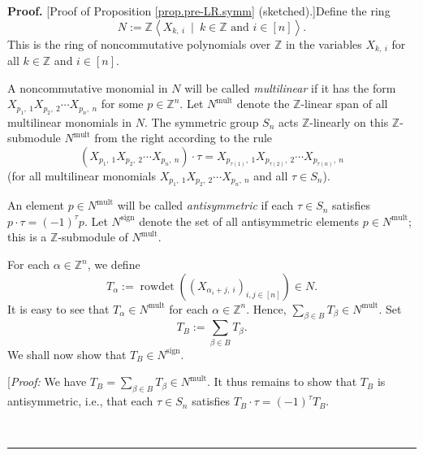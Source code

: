 \documentclass[numbers=enddot,12pt,final,onecolumn,notitlepage,english]{scrartcl}%
\theoremstyle{definition}
\newenvironment{proof}[1][Proof]{\noindent\textbf{#1.} }{\ \rule{0.5em}{0.5em}}
\let\sumnonlimits\sum
\renewcommand{\sum}{\sumnonlimits\limits}
\begin{document}
\begin{proof}
[Proof of Proposition \ref{prop.pre-LR.symm} (sketched).]Define the ring%
\[
N:=\mathbb{Z}\left\langle X_{k,\ i}\ \mid\ k\in\mathbb{Z}\text{ and }%
i\in\left[  n\right]  \right\rangle .
\]
This is the ring of noncommutative polynomials over $\mathbb{Z}$ in the
variables $X_{k,\ i}$ for all $k\in\mathbb{Z}$ and $i\in\left[  n\right]  $.

A noncommutative monomial in $N$ will be called \emph{multilinear} if it has
the form $X_{p_{1},\ 1}X_{p_{2},\ 2}\cdots X_{p_{n},\ n}$ for some
$p\in\mathbb{Z}^{n}$. Let $N^{\operatorname*{mult}}$ denote the $\mathbb{Z}%
$-linear span of all multilinear monomials in $N$. The symmetric group $S_{n}$
acts $\mathbb{Z}$-linearly on this $\mathbb{Z}$-submodule
$N^{\operatorname*{mult}}$ from the right according to the rule%
\begin{equation}
\left(  X_{p_{1},\ 1}X_{p_{2},\ 2}\cdots X_{p_{n},\ n}\right)  \cdot
\tau=X_{p_{\tau\left(  1\right)  },\ 1}X_{p_{\tau\left(  2\right)  }%
,\ 2}\cdots X_{p_{\tau\left(  n\right)  },\ n}
\label{pf.prop.pre-LR.symm.mon-acn}%
\end{equation}
(for all multilinear monomials $X_{p_{1},\ 1}X_{p_{2},\ 2}\cdots X_{p_{n}%
,\ n}$ and all $\tau\in S_{n}$).

An element $p\in N^{\operatorname*{mult}}$ will be called \emph{antisymmetric}
if each $\tau\in S_{n}$ satisfies $p\cdot\tau=\left(  -1\right)  ^{\tau}p$.
Let $N^{\operatorname*{sign}}$ denote the set of all antisymmetric elements
$p\in N^{\operatorname*{mult}}$; this is a $\mathbb{Z}$-submodule of
$N^{\operatorname*{mult}}$.

For each $\alpha\in\mathbb{Z}^{n}$, we define%
\[
T_{\alpha}:=\operatorname*{rowdet}\left(  \left(  X_{\alpha_{i}+j,\ i}\right)
_{i,j\in\left[  n\right]  }\right)  \in N.
\]
It is easy to see that $T_{\alpha}\in N^{\operatorname*{mult}}$ for each
$\alpha\in\mathbb{Z}^{n}$. Hence, $\sum_{\beta\in B}T_{\beta}\in
N^{\operatorname*{mult}}$. Set%
\begin{equation}
T_{B}:=\sum_{\beta\in B}T_{\beta}. \label{pf.prop.pre-LR.symm.TB=}%
\end{equation}
We shall now show that $T_{B}\in N^{\operatorname*{sign}}$.

[\textit{Proof:} We have $T_{B}=\sum_{\beta\in B}T_{\beta}\in
N^{\operatorname*{mult}}$. It thus remains to show that $T_{B}$ is
antisymmetric, i.e., that each $\tau\in S_{n}$ satisfies $T_{B}\cdot
\tau=\left(  -1\right)  ^{\tau}T_{B}$.


\end{proof}
\end{document}
